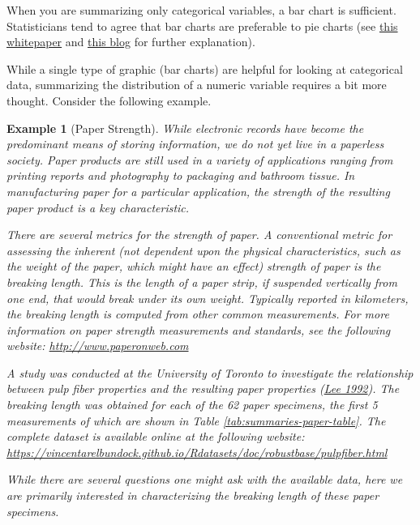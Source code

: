 \documentclass[
]{book}
\theoremstyle{plain}
\theoremstyle{mydefn}
\theoremstyle{myexmpl}
\newtheorem{example}{Example}[chapter]
\theoremstyle{remark}
\begin{document}
\begin{rmdtip}
When you are summarizing only categorical variables, a bar chart is sufficient. Statisticians tend to agree that bar charts are preferable to pie charts (see \href{https://www.google.com/url?sa=t\&rct=j\&q=\&esrc=s\&source=web\&cd=32\&cad=rja\&uact=8\&ved=0ahUKEwjk6Lf42sfVAhVl64MKHaTdAFY4HhAWCC4wAQ\&url=https\%3A\%2F\%2Fwww.perceptualedge.com\%2Farticles\%2Fvisual_business_intelligence\%2Fsave_the_pies_for_dessert.pdf\&usg=AFQjCNFkS-sogmLsZIOheWAPBZSNcqjzkg}{this whitepaper} and \href{http://www.storytellingwithdata.com/blog/2014/06/alternatives-to-pies}{this blog} for further explanation).
\end{rmdtip}

While a single type of graphic (bar charts) are helpful for looking at categorical data, summarizing the distribution of a numeric variable requires a bit more thought. Consider the following example.

\begin{example}[Paper Strength]
\protect\hypertarget{exm:summaries-paper}{}{\label{exm:summaries-paper} {} }While electronic records have become the predominant means of storing information, we do not yet live in a paperless society. Paper products are still used in a variety of applications ranging from printing reports and photography to packaging and bathroom tissue. In manufacturing paper for a particular application, the strength of the resulting paper product is a key characteristic.

There are several metrics for the strength of paper. A conventional metric for assessing the inherent (not dependent upon the physical characteristics, such as the weight of the paper, which might have an effect) strength of paper is the \emph{breaking length}. This is the length of a paper strip, if suspended vertically from one end, that would break under its own weight. Typically reported in kilometers, the breaking length is computed from other common measurements. For more information on paper strength measurements and standards, see the following website: \url{http://www.paperonweb.com}

A study was conducted at the University of Toronto to investigate the relationship between pulp fiber properties and the resulting paper properties (\protect\hyperlink{ref-Lee1992}{Lee 1992}). The breaking length was obtained for each of the 62 paper specimens, the first 5 measurements of which are shown in Table \ref{tab:summaries-paper-table}. The complete dataset is available online at the following website: \url{https://vincentarelbundock.github.io/Rdatasets/doc/robustbase/pulpfiber.html}

While there are several questions one might ask with the available data, here we are primarily interested in characterizing the breaking length of these paper specimens.
\end{example}
\end{document}

